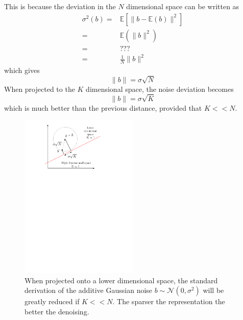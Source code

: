 This is because the deviation in the $N$ dimensional space can be written as
\begin{align*}
\sigma^2(b) =& \mathbb{E}\left[\lVert b-\mathbb{E}(b) \rVert^2 \right]\\
=& \mathbb{E}\left(\lVert b \rVert^2 \right)\\
=& ???\\
=& \frac{1}{N}\lVert b \rVert^2
\end{align*}
which gives 
$$ \lVert b \rVert = \sigma\sqrt{N} $$
When projected to the $K$ dimensional space, the noise deviation becomes
$$\lVert b \rVert = \sigma\sqrt{K} $$
which is much better than the previous distance, provided that $K<<N$. 

\begin{figure}[!h]\centering
\includegraphics[width=0.5\textwidth]{figures/sparse-reduce-noise.pdf}
\caption{When projected onto a lower dimensional space, the standard derivation of the additive Gaussian noise $b \sim \mathcal{N}(0,\sigma^2)$ will be greatly reduced if $K<<N$. The sparser the representation the better the denoising. \label{sparse_reduce_noise}}
\end{figure}



\printbibliography





